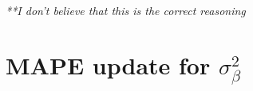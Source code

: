\documentclass[twoside]{article}
\newcommand{\1}{\\[1ex]}
\newcommand{\2}{\\[2ex]}
\newcommand{\3}{\\[3ex]}
\newcommand{\4}{\\[4ex]}
\begin{document}
\textit{**I don't believe that this is the correct reasoning}

\section{MAPE update for $\sigma^2_\beta$}

%
%
%
%
%
%
%
%
%
%
%
\end{document}
